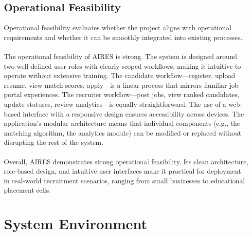   
 \subsection{Operational Feasibility}
 Operational feasibility evaluates whether the project aligns with operational requirements and whether it can be smoothly integrated into existing processes.\\\\
 The operational feasibility of AIRES is strong. The system is designed around two well-defined user roles with clearly scoped workflows, making it intuitive to operate without extensive training. The candidate workflow---register, upload resume, view match scores, apply---is a linear process that mirrors familiar job portal experiences. The recruiter workflow---post jobs, view ranked candidates, update statuses, review analytics---is equally straightforward. The use of a web-based interface with a responsive design ensures accessibility across devices. The application's modular architecture means that individual components (e.g., the matching algorithm, the analytics module) can be modified or replaced without disrupting the rest of the system.\\\\
\noindent
Overall, AIRES demonstrates strong operational feasibility. Its clean architecture, role-based design, and intuitive user interfaces make it practical for deployment in real-world recruitment scenarios, ranging from small businesses to educational placement cells.
 \section{System Environment}
 
